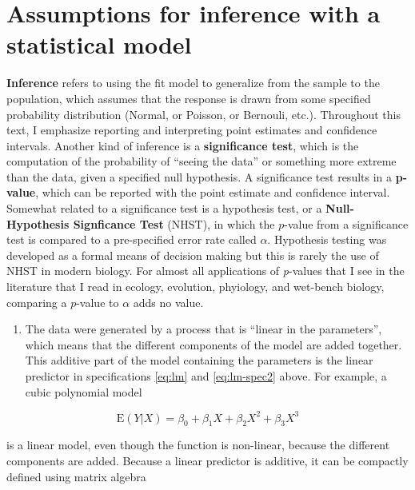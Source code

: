 \documentclass[]{book}
\providecommand{\tightlist}{%
  \setlength{\itemsep}{0pt}\setlength{\parskip}{0pt}}
\begin{document}
\hypertarget{assumptions-for-inference-with-a-statistical-model}{%
\section{Assumptions for inference with a statistical model}\label{assumptions-for-inference-with-a-statistical-model}}

\textbf{Inference} refers to using the fit model to generalize from the sample to the population, which assumes that the response is drawn from some specified probability distribution (Normal, or Poisson, or Bernouli, etc.). Throughout this text, I emphasize reporting and interpreting point estimates and confidence intervals. Another kind of inference is a \textbf{significance test}, which is the computation of the probability of ``seeing the data'' or something more extreme than the data, given a specified null hypothesis. A significance test results in a \textbf{p-value}, which can be reported with the point estimate and confidence interval. Somewhat related to a significance test is a hypothesis test, or a \textbf{Null-Hypothesis Signficance Test} (NHST), in which the \(p\)-value from a significance test is compared to a pre-specified error rate called \(\alpha\). Hypothesis testing was developed as a formal means of decision making but this is rarely the use of NHST in modern biology. For almost all applications of \emph{p}-values that I see in the literature that I read in ecology, evolution, phyiology, and wet-bench biology, comparing a \(p\)-value to \(\alpha\) adds no value.

\begin{enumerate}
\def\labelenumi{\arabic{enumi}.}
\tightlist
\item
  The data were generated by a process that is ``linear in the parameters'', which means that the different components of the model are added together. This additive part of the model containing the parameters is the linear predictor in specifications \eqref{eq:lm} and \eqref{eq:lm-spec2} above. For example, a cubic polynomial model
\end{enumerate}

\begin{equation}
\mathrm{E}(Y|X) = \beta_0 + \beta_1 X + \beta_2 X^2 + \beta_3 X^3
\end{equation}

is a linear model, even though the function is non-linear, because the different components are added. Because a linear predictor is additive, it can be compactly defined using matrix algebra
\end{document}
